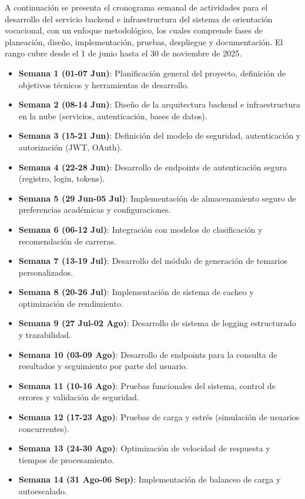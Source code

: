 A continuación se presenta el cronograma semanal de actividades para el desarrollo del servicio backend e infraestructura del sistema de orientación vocacional, con un enfoque metodológico, los cuales comprende fases de planeación, diseño, implementación, pruebas, despliegue y documentación. El rango cubre desde el 1 de junio hasta el 30 de noviembre de 2025.

\begin{itemize}
  \item \textbf{Semana 1 (01-07 Jun)}: Planificación general del proyecto, definición de objetivos técnicos y herramientas de desarrollo.
  \item \textbf{Semana 2 (08-14 Jun)}: Diseño de la arquitectura backend e infraestructura en la nube (servicios, autenticación, bases de datos).
  \item \textbf{Semana 3 (15-21 Jun)}: Definición del modelo de seguridad, autenticación y autorización (JWT, OAuth).
  \item \textbf{Semana 4 (22-28 Jun)}: Desarrollo de endpoints de autenticación segura (registro, login, tokens).
  \item \textbf{Semana 5 (29 Jun-05 Jul)}: Implementación de almacenamiento seguro de preferencias académicas y configuraciones.
  \item \textbf{Semana 6 (06-12 Jul)}: Integración con modelos de clasificación y recomendación de carreras.
  \item \textbf{Semana 7 (13-19 Jul)}: Desarrollo del módulo de generación de temarios personalizados.
  \item \textbf{Semana 8 (20-26 Jul)}: Implementación de sistema de cacheo y optimización de rendimiento.
  \item \textbf{Semana 9 (27 Jul-02 Ago)}: Desarrollo de sistema de logging estructurado y trazabilidad.
  \item \textbf{Semana 10 (03-09 Ago)}: Desarrollo de endpoints para la consulta de resultados y seguimiento por parte del usuario.
  \item \textbf{Semana 11 (10-16 Ago)}: Pruebas funcionales del sistema, control de errores y validación de seguridad.
  \item \textbf{Semana 12 (17-23 Ago)}: Pruebas de carga y estrés (simulación de usuarios concurrentes).
  \item \textbf{Semana 13 (24-30 Ago)}: Optimización de velocidad de respuesta y tiempos de procesamiento.
  \item \textbf{Semana 14 (31 Ago-06 Sep)}: Implementación de balanceo de carga y autoescalado.

\end{itemize}
